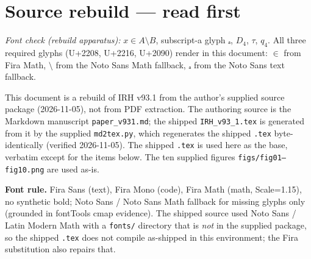\documentclass[a4paper,11pt]{article}
\begin{document}
\begin{abstract}
\textbf{What is excluded by theorem.} SO(8) cannot be the gauge algebra, by two independent proofs. The Standard Model algebra does not embed in $\mathfrak{so}(8)$ by any route. The anisotropy coefficient $\xi_2=-1/384$ is not derivable from the stated lattice. Both time-step values stated in v92 violate the framework's own stability bound. Three generations is \textbf{not} a derived result: five candidate mechanisms were tested and all five are closed. Monopole absence, claimed in earlier versions, is inconsistent with an $E_6$ gauge group.

\textbf{What remains open} is stated exhaustively in \S~IX, classified by the type of work each item requires. Every correction made during verification --- including corrections to the author's own prior output --- is recorded in the appendices, and every externally attributable claim carries a linked numerical citation.

The framework claims substantially less than v92 did. What it now claims has been checked --- by hand, by simulation, by independent reproduction, and now by machine.
\end{abstract}

\section*{Source rebuild --- read first}

\noindent\textit{Font check (rebuild apparatus):} $x \in A \setminus B$, subscript-a glyph {\notosans ₐ}, $D_4$, $\tau$, $q_4$. All three required glyphs (U+2208, U+2216, U+2090) render in this document: $\in$ from Fira Math, $\setminus$ from the Noto Sans Math fallback, {\notosans ₐ} from the Noto Sans text fallback.

This document is a rebuild of IRH v93.1 from the author's supplied source package (2026-11-05), not from PDF extraction. The authoring source is the Markdown manuscript \texttt{paper\_v931.md}; the shipped \texttt{IRH\_v93\_1.tex} is generated from it by the supplied \texttt{md2tex.py}, which regenerates the shipped \texttt{.tex} byte-identically (verified 2026-11-05). The shipped \texttt{.tex} is used here as the base, verbatim except for the items below. The ten supplied figures \texttt{figs/fig01--fig10.png} are used as-is.

\textbf{Font rule.} Fira Sans (text), Fira Mono (code), Fira Math (math, Scale=1.15), no synthetic bold; Noto Sans / Noto Sans Math fallback for missing glyphs only (grounded in fontTools cmap evidence). The shipped source used Noto Sans / Latin Modern Math with a \texttt{fonts/} directory that is \textit{not} in the supplied package, so the shipped \texttt{.tex} does not compile as-shipped in this environment; the Fira substitution also repairs that.
\end{document}
